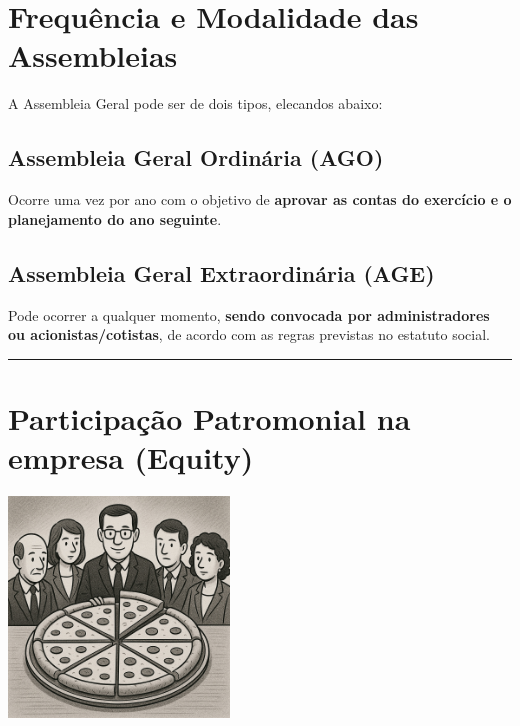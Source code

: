 \documentclass[
]{book}
\begin{document}
\section{\texorpdfstring{\textbf{Frequência e Modalidade das Assembleias}}{Frequência e Modalidade das Assembleias}}\label{frequuxeancia-e-modalidade-das-assembleias}

A Assembleia Geral pode ser de dois tipos, elecandos abaixo:

\subsection{\texorpdfstring{\textbf{Assembleia Geral Ordinária (AGO)}}{Assembleia Geral Ordinária (AGO)}}\label{assembleia-geral-ordinuxe1ria-ago}

Ocorre uma vez por ano com o objetivo de \textbf{aprovar as contas do exercício e o planejamento do ano seguinte}.

\subsection{\texorpdfstring{\textbf{Assembleia Geral Extraordinária (AGE)}}{Assembleia Geral Extraordinária (AGE)}}\label{assembleia-geral-extraordinuxe1ria-age}

Pode ocorrer a qualquer momento, \textbf{sendo convocada por administradores ou acionistas/cotistas}, de acordo com as regras previstas no estatuto social.

\begin{center}\rule{0.5\linewidth}{0.5pt}\end{center}

\section{Participação Patromonial na empresa (Equity)}\label{participauxe7uxe3o-patromonial-na-empresa-equity}

\includegraphics[width=2.3125in,height=\textheight]{images/03-2025-08-19_20/02-assembleia_cotistas-equity.jpg}
\end{document}
